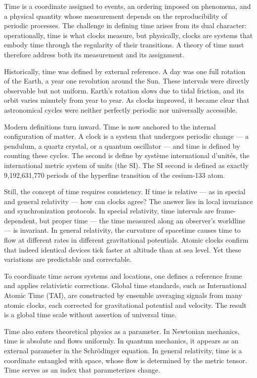 Time is a coordinate assigned to events, an ordering imposed on phenomena, and a physical quantity whose measurement depends on the reproducibility of periodic processes. The challenge in defining time arises from its dual character: operationally, time is what clocks measure, but physically, clocks are systems that embody time through the regularity of their transitions. A theory of time must therefore address both its measurement and its assignment.

Historically, time was defined by external reference. A day was one full rotation of the Earth, a year one revolution around the Sun. These intervals were directly observable but not uniform. Earth's rotation slows due to tidal friction, and its orbit varies minutely from year to year. As clocks improved, it became clear that astronomical cycles were neither perfectly periodic nor universally accessible.

Modern definitions turn inward. Time is now anchored to the internal configuration of matter. A clock is a system that undergoes periodic change — a pendulum, a quartz crystal, or a quantum oscillator — and time is defined by counting these cycles. The second is define by système international d'unités, the international metric system of units (the SI). The SI second is defined as exactly 9,192,631,770 periods of the hyperfine transition of the cesium-133 atom.

Still, the concept of time requires consistency. If time is relative — as in special and general relativity — how can clocks agree? The answer lies in local invariance and synchronization protocols. In special relativity, time intervals are frame-dependent, but proper time — the time measured along an observer’s worldline — is invariant. In general relativity, the curvature of spacetime causes time to flow at different rates in different gravitational potentials. Atomic clocks confirm that indeed identical devices tick faster at altitude than at sea level. Yet these variations are predictable and correctable.

To coordinate time across systems and locations, one defines a reference frame and applies relativistic corrections. Global time standards, such as International Atomic Time (TAI), are constructed by ensemble averaging signals from many atomic clocks, each corrected for gravitational potential and velocity. The result is a global time scale without assertion of universal time. 

Time also enters theoretical physics as a parameter. In Newtonian mechanics, time is absolute and flows uniformly. In quantum mechanics, it appears as an external parameter in the Schrödinger equation. In general relativity, time is a coordinate entangled with space, whose flow is determined by the metric tensor. Time serves as an index that parameterizes change.

